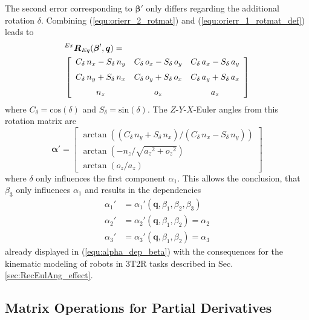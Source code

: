\documentclass[twocolumn,10pt]{IFTOMM}
\newcommand{\bm}[1]{\boldsymbol{#1}}
\newcommand{\rotmat}[2]{{{ }^{#1}\boldsymbol{R}}_{#2}}
\begin{document}
The second error corresponding to $\bm{\beta}'$ only differs regarding the additional rotation $\delta$. Combining (\ref{equ:orierr_2_rotmat}) and (\ref{equ:orierr_1_rotmat_def}) leads to
%
\begin{align}
&\rotmat{Ex}{Eq}(\bm{\beta}',\bm{q})
= \\
&\left[ \begin {array}{ccc} { C_{\delta}}\,{n_x}-{ S_{\delta}}\,{ n_y}&{ C_{\delta}}\,{o_x}-{ S_{\delta}}\,{o_y}&{ C_{\delta}}\,{ a_x}-{ S_{\delta}}\,{a_y}\\ \noalign{\medskip}{ C_{\delta}}\,{n_y}+ { S_{\delta}}\,{n_x}&{ C_{\delta}}\,{o_y}+{ S_{\delta}}\,{o_x}&{  C_{\delta}}\,{a_y}+{ S_{\delta}}\,{a_x}\\ \noalign{\medskip}{ n_z}&{o_z}&{a_z}\end {array} \right] \nonumber
\end{align}
%
where $C_{\delta}=\mathrm{cos}(\delta)$ and $S_{\delta}=\mathrm{sin}(\delta)$.
The $Z$-$Y$-$X$-Euler angles from this rotation matrix are
%
\begin{equation}
\bm{\alpha}' =
\begin{bmatrix}
\arctan \left( ({  C_{\delta}}\,{n_y}+{ S_{\delta}}\,{n_x}) / ({ C_{\delta}}\,{n_x}-{  S_{\delta}}\,{n_y}) \right) \\
\arctan \left( -{n_z} / \sqrt {{{a_z}}^{2}+{{ o_z}}^{2}} \right) \\
\arctan \left( {o_z} / {a_z} \right)
\end{bmatrix}
\end{equation}
%
where $\delta$  only influences the first component $\alpha_1$.
This allows the conclusion, that $\beta_3$ only influences $\alpha_1$ and results in the dependencies
%
\begin{align}
\alpha_1'&=\alpha_1'(\bm{q},\beta_1,\beta_2,\beta_3)\\
\alpha_2'&=\alpha_2'(\bm{q},\beta_1,\beta_2) =\alpha_2\\
\alpha_3'&=\alpha_3'(\bm{q},\beta_1,\beta_2) =\alpha_3
\end{align}
%
already displayed in (\ref{equ:alpha_dep_beta}) with the consequences for the kinematic modeling of robots in 3T2R tasks described in Sec.\,\ref{sec:RecEulAng_effect}.

\subsection{Matrix Operations for Partial Derivatives}
\label{sec:appendix_gradient_matrix}
\end{document}
